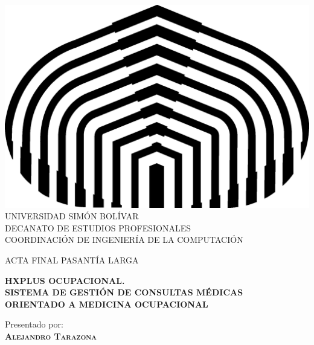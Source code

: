 \begin{titlepage}
    \begin{center}
        
        \includegraphics[scale=0.5]{figures/logo} \\
        
        \textsc {\large UNIVERSIDAD SIM\'ON BOL\'IVAR} \\
        \textsc{DECANATO DE ESTUDIOS PROFESIONALES\\
            COORDINACI\'ON DE INGENIER\'IA DE LA COMPUTACI\'ON}
        
        \bigskip
        \bigskip
        \bigskip
        \bigskip
        \bigskip
        \bigskip
        
        \textsc{ACTA FINAL PASANTÍA LARGA}
        
        \bigskip
        \bigskip
        
        \textsc{\bfseries HXPLUS OCUPACIONAL.\\
            SISTEMA DE GESTIÓN DE CONSULTAS MÉDICAS\\
            ORIENTADO A MEDICINA OCUPACIONAL}
        
        \bigskip
        \bigskip
        \bigskip
        \bigskip
        
        \begin{minipage}{\textwidth}
            \centering
            Presentado por: \\
            \textsc{\bfseries Alejandro Tarazona} \\
            

\end{minipage}
\end{center}
\end{titlepage}
